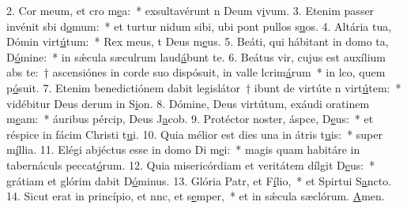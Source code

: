 2. Cor meum, et cro m\uline{e}a:~* exsultavérunt n Deum v\uline{i}vum.
3. Etenim passer invénit sbi d\uline{o}mum:~* et turtur nidum sibi, ubi pont pullos s\uline{u}os.
4. Altária tua, Dómin virt\uline{ú}tum:~* Rex meus, t Deus m\uline{e}us.
5. Beáti, qui hábitant in domo ta, D\uline{ó}mine:~* in sǽcula sæculrum laud\uline{á}bunt te.
6. Beátus vir, cujus est auxílium abs te:~† ascensiónes in corde suo dispósuit, in valle lcrim\uline{á}rum~* in lco, quem p\uline{ó}suit.
7. Etenim benedictiónem dabit legislátor~† ibunt de virtúte n virt\uline{ú}tem:~* vidébitur Deus derum in S\uline{i}on.
8. Dómine, Deus virtútum, exáudi oratinem m\uline{e}am:~* áuribus pércip, Deus J\uline{a}cob.
9. Protéctor noster, áspce, D\uline{e}us:~* et réspice in fácim Christi t\uline{u}i.
10. Quia mélior est dies una in átris t\uline{u}is:~* super m\uline{í}llia.
11. Elégi abjéctus esse in domo Di m\uline{e}i:~* magis quam habitáre in tabernáculs peccat\uline{ó}rum.
12. Quia misericórdiam et veritátem dílgit D\uline{e}us:~* grátiam et glórim dabit D\uline{ó}minus.
13. Glória Patr, et F\uline{í}lio,~* et Spirtui S\uline{a}ncto.
14. Sicut erat in princípio, et nnc, et s\uline{e}mper,~* et in sǽcula sæclórum. \uline{A}men.
